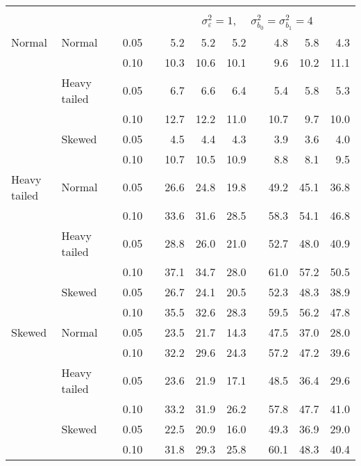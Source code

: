 \begin{table}[ht]
\begin{scriptsize}
\begin{center}
\begin{tabular}{ll p{.1cm} c p{.1cm} rrr p{.1cm} rrr}
&&&&&&&&&&&\\
& && && \multicolumn{7}{c}{$\sigma_{\varepsilon}^2 = 1$, \ \ $\sigma_{b_0}^2 = \sigma_{b_1}^2 = 4$} \\ \cline{6-12}
Normal       & Normal       && 0.05 &&   5.2 & 5.2 & 5.2 &   & 4.8 & 5.8 & 4.3 \\ 
             &              && 0.10 &&   10.3 & 10.6 & 10.1 &   & 9.6 & 10.2 & 11.1 \\ 
             & Heavy tailed && 0.05 &&   6.7 & 6.6 & 6.4 &   & 5.4 & 5.8 & 5.3 \\ 
             &              && 0.10 &&   12.7 & 12.2 & 11.0 &   & 10.7 & 9.7 & 10.0 \\ 
             & Skewed       && 0.05 &&   4.5 & 4.4 & 4.3 &   & 3.9 & 3.6 & 4.0 \\ 
             &              && 0.10 &&   10.7 & 10.5 & 10.9 &   & 8.8 & 8.1 & 9.5 \\ 
Heavy tailed & Normal       && 0.05 &&   26.6 & 24.8 & 19.8 &   & 49.2 & 45.1 & 36.8 \\ 
             &              && 0.10 &&   33.6 & 31.6 & 28.5 &   & 58.3 & 54.1 & 46.8 \\ 
             & Heavy tailed && 0.05 &&   28.8 & 26.0 & 21.0 &   & 52.7 & 48.0 & 40.9 \\ 
             &              && 0.10 &&   37.1 & 34.7 & 28.0 &   & 61.0 & 57.2 & 50.5 \\ 
             & Skewed       && 0.05 &&   26.7 & 24.1 & 20.5 &   & 52.3 & 48.3 & 38.9 \\ 
             &              && 0.10 &&   35.5 & 32.6 & 28.3 &   & 59.5 & 56.2 & 47.8 \\ 
Skewed       & Normal       && 0.05 &&   23.5 & 21.7 & 14.3 &   & 47.5 & 37.0 & 28.0 \\ 
             &              && 0.10 &&   32.2 & 29.6 & 24.3 &   & 57.2 & 47.2 & 39.6 \\ 
             & Heavy tailed && 0.05 &&   23.6 & 21.9 & 17.1 &   & 48.5 & 36.4 & 29.6 \\ 
             &              && 0.10 &&   33.2 & 31.9 & 26.2 &   & 57.8 & 47.7 & 41.0 \\ 
             & Skewed       && 0.05 &&   22.5 & 20.9 & 16.0 &   & 49.3 & 36.9 & 29.0 \\ 
             &              && 0.10 &&   31.8 & 29.3 & 25.8 &   & 60.1 & 48.3 & 40.4 \\ 

\hline
\end{tabular}
\end{center}
\end{scriptsize}
\end{table}

